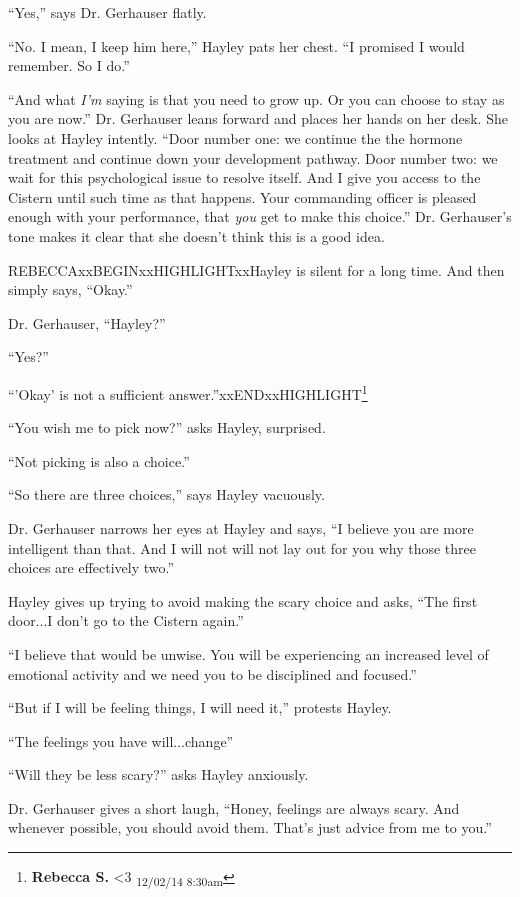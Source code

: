 ``Yes,'' says Dr. Gerhauser flatly.

``No.  I mean, I keep him here,'' Hayley pats her chest.  ``I promised I would remember.  So I do.''

``And what \textit{I'm} saying is that you need to grow up.  Or you can choose to stay as you are now.''  Dr. Gerhauser leans forward and places her hands on her desk.  She looks at Hayley intently.  ``Door number one: we continue the the hormone treatment and continue down your development pathway.  Door number two: we wait for this psychological issue to resolve itself.  And I give you access to the Cistern until such time as that happens.  Your commanding officer is pleased enough with your performance, that \textit{you} get to make this choice.''  Dr. Gerhauser's tone makes it clear that she doesn't think this is a good idea. 

REBECCAxxBEGINxxHIGHLIGHTxxHayley is silent for a long time.  And then simply says, ``Okay.''

Dr. Gerhauser, ``Hayley?''

``Yes?''

``'Okay' is not a sufficient answer.''xxENDxxHIGHLIGHT\footnote{\textbf{Rebecca S. }\textless 3 \textsubscript{12/02/14 8:30am}}

``You wish me to pick now?'' asks Hayley, surprised.

``Not picking is also a choice.''

``So there are three choices,'' says Hayley vacuously.

Dr. Gerhauser narrows her eyes at Hayley and says, ``I believe you are more intelligent than that.  And I will not will not lay out for you why those three choices are effectively two.''

Hayley gives up trying to avoid making the scary choice and asks, ``The first door...I don't go to the Cistern again.''

``I believe that would be unwise.  You will be experiencing an increased level of emotional activity and we need you to be disciplined and focused.''

``But if I will be feeling things, I will need it,'' protests Hayley.

``The feelings you have will...change''

``Will they be less scary?'' asks Hayley anxiously.

Dr. Gerhauser gives a short laugh, ``Honey, feelings are always scary.  And whenever possible, you should avoid them.  That's just advice from me to you.''

